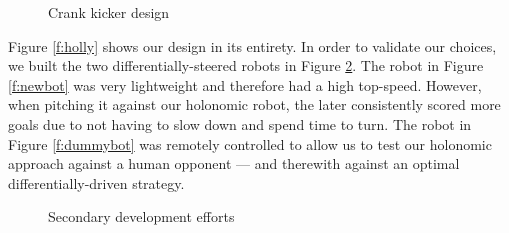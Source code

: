 \documentclass[journal,a4paper,12pt]{IEEEtran}
\begin{document}
\begin{figure}[!htb]
\centering
  \caption{Crank kicker design}
  \label{f:kicker}
\end{figure}

Figure \ref{f:holly} shows our design in its entirety. In order to validate our choices, we built the two differentially-steered  robots in Figure \ref{f:other_robots}. The robot in Figure \ref{f:newbot} was very lightweight and therefore had a high top-speed. However, when pitching it against our holonomic robot, the later consistently scored more goals due to not having to slow down and spend time to turn. The robot in Figure \ref{f:dummybot} was remotely controlled to allow us to test our holonomic approach against a human opponent --- and therewith against an optimal differentially-driven strategy.

\begin{figure}[!htb]
\centering
  \caption{Secondary development efforts}
  \label{f:other_robots}
\end{figure}
\end{document}
